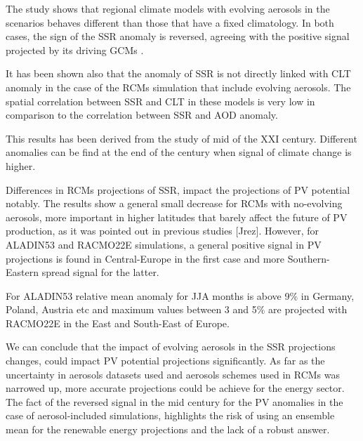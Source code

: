 The study shows that regional climate models with evolving aerosols in the scenarios behaves different than those that have a fixed climatology. In both cases, the sign of the SSR anomaly is reversed, agreeing with the positive signal projected by its driving GCMs . %

It has been shown also that the anomaly of SSR is not directly linked with CLT anomaly in the case of the RCMs simulation that include evolving aerosols. The spatial correlation between SSR and CLT in these models is very low in comparison to the correlation between SSR and AOD anomaly.

This results has been derived from the study of mid of the XXI century. Different anomalies can be find at the end of the century when signal of climate change is higher.

Differences in RCMs projections of SSR, impact the projections of PV potential notably. The results show a general small decrease for RCMs with no-evolving aerosols, more important in higher latitudes that barely affect the future of PV production, as it was pointed out in previous studies [Jrez]. However, for ALADIN53 and RACMO22E simulations, a general positive signal in PV projections is found in Central-Europe in the first case and more Southern-Eastern spread signal for the latter.

For ALADIN53 relative mean anomaly for JJA months is above 9$\%$ in Germany, Poland, Austria etc and maximum values between 3 and 5$\%$ are projected with RACMO22E in the East and South-East of Europe.  

We can conclude that the impact of evolving aerosols in the SSR projections changes, could impact PV potential projections significantly. As far as the uncertainty in aerosols datasets used and aerosols schemes used in RCMs was narrowed up, more accurate projections could be achieve for the energy sector. The fact of the reversed signal in the mid century for the PV anomalies in the case of aerosol-included simulations, highlights the risk of using an ensemble mean for the renewable energy projections and the lack of a robust answer.   


